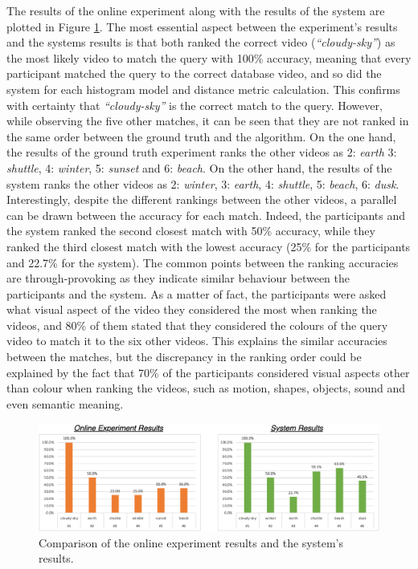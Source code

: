 \clearpage
The results of the online experiment along with the results of the system are plotted in Figure \ref{fig:evaluation-ground_truth_vs_system_results}. The most essential aspect between the experiment's results and the systems results is that both ranked the correct video (\textit{``cloudy-sky''}) as the most likely video to match the query with 100\% accuracy, meaning that every participant matched the query to the correct database video, and so did the system for each histogram model and distance metric calculation. This confirms with certainty that \textit{``cloudy-sky''} is the correct match to the query. However, while observing the five other matches, it can be seen that they are not ranked in the same order between the ground truth and the algorithm. On the one hand, the results of the ground truth experiment ranks the other videos as 2: \textit{earth} 3: \textit{shuttle}, 4: \textit{winter}, 5: \textit{sunset} and 6: \textit{beach}. On the other hand, the results of the system ranks the other videos as 2: \textit{winter}, 3: \textit{earth}, 4: \textit{shuttle}, 5: \textit{beach}, 6: \textit{dusk}. Interestingly, despite the different rankings between the other videos, a parallel can be drawn between the accuracy for each match. Indeed, the participants and the system ranked the second closest match with 50\% accuracy, while they ranked the third closest match with the lowest accuracy (25\% for the participants and 22.7\% for the system). The common points between the ranking accuracies are through-provoking as they indicate similar behaviour between the participants and the system. As a matter of fact, the participants were asked what visual aspect of the video they considered the most when ranking the videos, and 80\% of them stated that they considered the colours of the query video to match it to the six other videos. This explains the similar accuracies between the matches, but the discrepancy in the ranking order could be explained by the fact that 70\% of the participants considered visual aspects other than colour when ranking the videos, such as motion, shapes, objects, sound and even semantic meaning.

\begin{figure}[h] 
\centerline{\includegraphics[width=\textwidth]{figures/evaluation/ground_truth_vs_system_results.png}}
\caption{\label{fig:evaluation-ground_truth_vs_system_results}Comparison of the online experiment results and the system's results.}
\end{figure}

